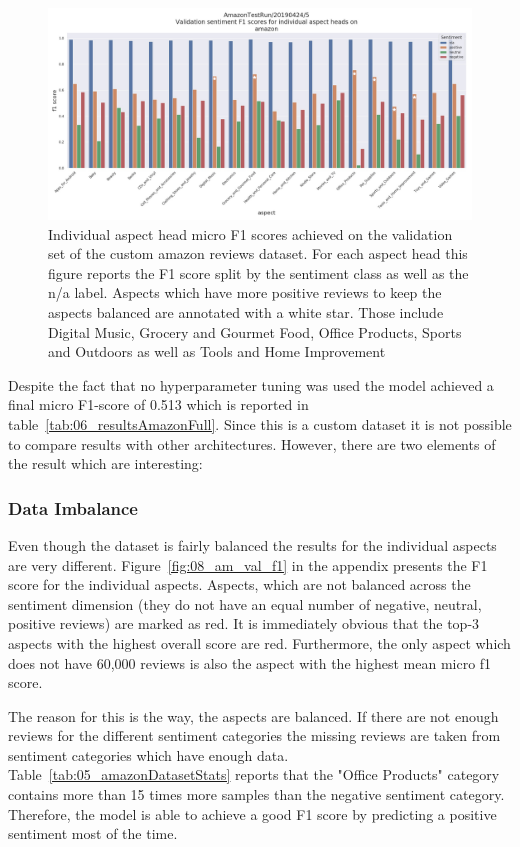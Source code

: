\begin{figure}[htb]
	\centering
	\includegraphics[width=\textwidth]{figures/06_results/06_am_final_val_f1Sent}
	\caption{Individual aspect head micro F1 scores achieved on the validation set of the custom amazon reviews dataset. For each aspect head this figure reports the F1 score split by the sentiment class as well as the n/a label. Aspects which have more positive reviews to keep the aspects balanced are annotated with a white star. Those include Digital Music, Grocery and Gourmet Food, Office Products, Sports and Outdoors as well as Tools and Home Improvement}
	\label{fig:06_am_val_f1sent}
\end{figure}

Despite the fact that no hyperparameter tuning was used the model achieved a final micro F1-score of 0.513 which is reported in table~\ref{tab:06_resultsAmazonFull}. Since this is a custom dataset it is not possible to compare results with other architectures. However, there are two elements of the result which are interesting:
\medskip

\subsubsection*{Data Imbalance}
Even though the dataset is fairly balanced the results for the individual aspects are very different. Figure~\ref{fig:08_am_val_f1} in the appendix presents the F1 score for the individual aspects. Aspects, which are not balanced across the sentiment dimension {(they do not have an equal number of negative, neutral, positive reviews)} are marked as red. It is immediately obvious that the top-3 aspects with the highest overall score are red. Furthermore, the only aspect which does not have 60,000 reviews is also the aspect with the highest mean micro f1 score. 
\smallskip

The reason for this is the way, the aspects are balanced. If there are not enough reviews for the different sentiment categories the missing reviews are taken from sentiment categories which have enough data. Table~\ref{tab:05_amazonDatasetStats} reports that the "Office Products" category contains more than 15 times more samples than the negative sentiment category. Therefore, the model is able to achieve a good F1 score by predicting a positive sentiment most of the time.
\smallskip

